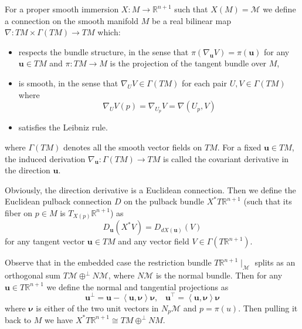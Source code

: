 \begin{definition}[Connection]\label{def:Connection}
    For a proper smooth immersion $X:M\to\mathbb{R}^{n+1}$ such that $X(M)=\mathcal{M}$ we define a connection on the smooth manifold $M$ be a real bilinear map $\nabla:TM\times\Gamma(TM)\to TM$ which:
    \begin{itemize}
        \item respects the bundle structure, in the sense that $\pi(\nabla_{\boldsymbol{u}}V)=\pi(\boldsymbol{u})$ for any $\boldsymbol{u}\in TM$ and $\pi:TM\to M$ is the projection of the tangent bundle over $M$,
        \item is smooth, in the sense that $\nabla_U V\in\Gamma(TM)$ for each pair $U,V\in\Gamma(TM)$ where
        \begin{equation*}
            \nabla_U V(p)=\nabla_{U_p}V=\nabla(U_p,V)
        \end{equation*}
        \item satisfies the Leibniz rule.
    \end{itemize}
    where $\Gamma(TM)$ denotes all the smooth vector fields on $TM$. For a fixed $\boldsymbol{u}\in TM$, the induced derivation $\nabla_{\boldsymbol{u}}:\Gamma(TM)\to TM$ is called the covariant derivative in the direction $\boldsymbol{u}$.
\end{definition}

Obviously, the direction derivative is a Euclidean connection. Then we define the Euclidean pulback connection $D$ on the pulback bundle $X^* T\mathbb{R}^{n+1}$ (such that its fiber on $p\in M$ is $T_{X(p)}\mathbb{R}^{n+1}$) as
\begin{equation*}
    D_{\boldsymbol{u}}(X^* V)=D_{dX(\boldsymbol{u})}(V)
\end{equation*}
for any tangent vector $\boldsymbol{u}\in TM$ and any vector field $V\in \Gamma(T\mathbb{R}^{n+1})$.

Observe that in the embedded case the restriction bundle $T\mathbb{R}^{n+1}\mid_{\mathcal{M}}$ splits as an orthogonal sum $T\mathcal{M}\oplus^{\bot}N\mathcal{M}$, where $N\mathcal{M}$ is the normal bundle. Then for any $\boldsymbol{u}\in T\mathbb{R}^{n+1}$ we define the normal and tangential projections as
\begin{equation*}
    {\boldsymbol{u}}^\bot=\boldsymbol{u}-\left<\boldsymbol{u},\boldsymbol{\nu}\right>\boldsymbol{\nu},\,\,\,\,\, {\boldsymbol{u}}^\top=\left<\boldsymbol{u},\boldsymbol{\nu}\right>\boldsymbol{\nu}
\end{equation*}
where $\boldsymbol{\nu}$ is either of the two unit vectors in $N_p\mathcal{M}$ and $p=\pi(u)$. Then pulling it back to $M$ we have $X^* T\mathbb{R}^{n+1}\cong TM\oplus^\bot NM$.

